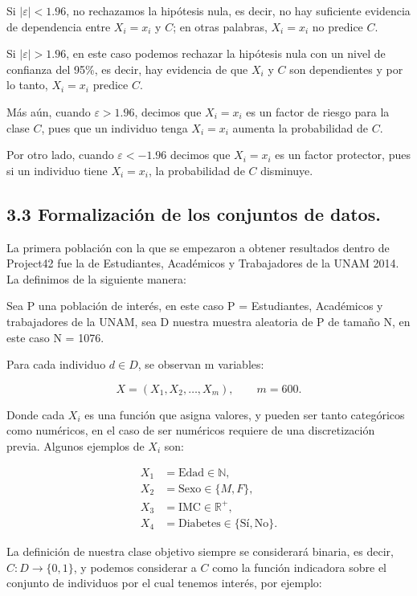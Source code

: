 \documentclass[
 12pt,
 letterpaper,
]{article}
\theoremstyle{teoremaBreak}
\theoremstyle{plain}
\theoremstyle{definition}
\begin{document}
Si $|\varepsilon| < 1.96$, no rechazamos la hipótesis
nula, es decir, no hay suficiente evidencia de dependencia entre $X_i = x_i$
y $C$; en otras palabras, $X_i = x_i$ no predice $C$.

Si $|\varepsilon| > 1.96$, en este caso podemos
rechazar la hipótesis nula con un nivel de confianza del 95\%, es decir,
hay evidencia de que $X_i$ y $C$ son dependientes y por lo tanto, $X_i = x_i$
predice $C$.

Más aún, cuando $\varepsilon > 1.96$, decimos que $X_i = x_i$ es un factor
de riesgo para la clase $C$, pues que un individuo tenga $X_i = x_i$ aumenta
la probabilidad de $C$.

Por otro lado, cuando $\varepsilon < -1.96$ decimos que $X_i = x_i$ es un
factor protector, pues si un individuo tiene $X_i = x_i$, la probabilidad de
$C$ disminuye.

\subsection{3.3 Formalización de los conjuntos de
datos.}\label{formalizaciuxf3n-de-los-conjuntos-de-datos.}

La primera población con la que se empezaron a obtener resultados dentro
de Project42 fue la de Estudiantes, Académicos y Trabajadores de la UNAM
2014. La definimos de la siguiente manera:

Sea P una población de interés, en este caso P = Estudiantes, Académicos
y trabajadores de la UNAM, sea D nuestra muestra aleatoria de P de
tamaño N, en este caso N = 1076.

Para cada individuo $d \in D$, se observan m variables:

\[
X = (X_1, X_2, \ldots, X_m), \qquad m = 600.
\]

Donde cada $X_i$ es una función que asigna valores, y pueden ser tanto
categóricos como numéricos, en el caso de ser numéricos requiere de una
discretización previa. Algunos ejemplos de $X_i$ son:

\begin{align*}
X_1 &= \text{Edad} \in \mathbb{N}, \\
X_2 &= \text{Sexo} \in \{M, F\}, \\
X_3 &= \text{IMC} \in \mathbb{R}^+, \\
X_4 &= \text{Diabetes} \in \{\text{Sí}, \text{No}\}.
\end{align*}

La definición de nuestra clase objetivo siempre se considerará binaria,
es decir, $C: D \to \{0, 1\}$, y podemos considerar a $C$ como
la función indicadora sobre el conjunto de individuos por el cual
tenemos interés, por ejemplo:
\end{document}
